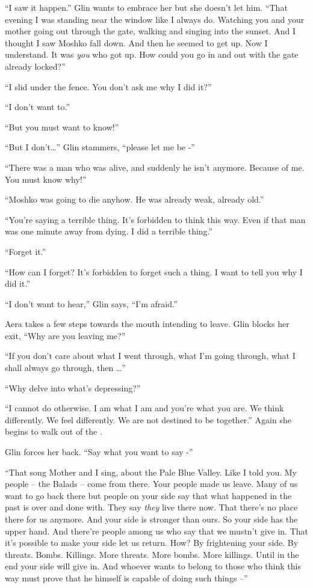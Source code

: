 \documentclass[twoside,11pt]{book}
\begin{document}
``I saw it happen.'' Glin wants to embrace her but she doesn't let him. ``That
evening I was standing near the window like I always do. Watching you and your mother going out through the gate,
walking and singing into the sunset. And I thought I saw Moshko fall down. And then he seemed to get up. Now I
understand. It was \textit{you} who got up. How could you go in and out with the gate already locked?''

``I slid under the fence. You don't ask me why I did it?''

``I don't want to.''

``But you must want to know!''

``But I don't{\dots}'' Glin stammers, ``please let me be -''

``There was a man who was alive, and suddenly he isn't anymore. Because of me. You must know
why!''

``Moshko was going to die anyhow. He was already weak, already old.''

``You're saying a terrible thing. It's forbidden to think this way. Even if that man was one minute away
from dying. I did a terrible thing.''

``Forget it.''

``How can I forget? It's forbidden to forget such a thing. I want to tell you why I did it.''

``I don't want to hear,'' Glin says, ``I'm afraid.''

Aera takes a few steps towards the mouth intending to leave. Glin blocks her exit, ``Why
are you leaving me?''

``If you don't care about what I went through, what I'm going through, what I shall always go through, then
{\dots}''

``Why delve into what's depressing?''

``I cannot do otherwise. I am what I am and you're what you are. We think differently. We feel differently.
We are not destined to be together.'' Again she begins to walk out of the .

Glin forces her back. ``Say what you want to say -''

``That song Mother and I sing, about the Pale Blue Valley. Like I told you. My people -- the Balads -- come
from there. Your people made us leave. Many of us want to go back there but people on your side say that what happened
in the past is over and done with.  They say \textit{they} live there now. That there's no place there for us anymore.
And your side is stronger than ours. So your side has the upper hand. And there're people among us who say that we
mustn't give in. That it's possible to make your side let us return. How? By frightening your side. By threats. Bombs.
Killings. More threats. More bombs. More killings. Until in the end your side will give in. And whoever wants to belong
to those who think this way must prove that he himself is capable of  doing such things --''
\end{document}
